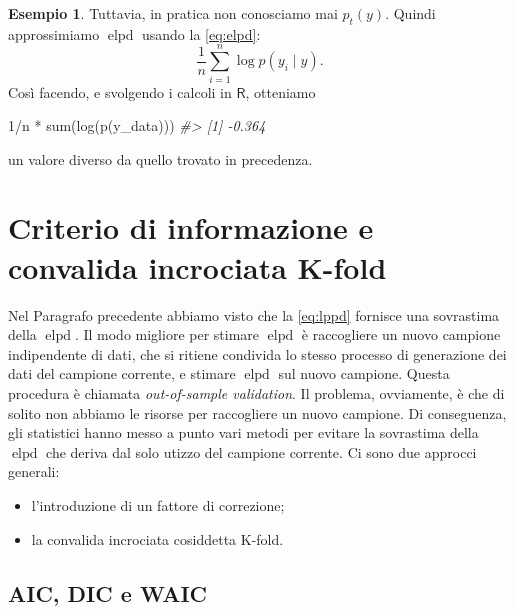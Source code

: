 \documentclass[
  10pt,
  italian,
  a4paper,
  extrafontsizes,onecolumn,openright
  ]{memoir}
\newenvironment{Shaded}{\begin{snugshade}}{\end{snugshade}}
\newcommand{\CommentTok}[1]{\textcolor[rgb]{0.56,0.35,0.01}{\textit{#1}}}
\newcommand{\DecValTok}[1]{\textcolor[rgb]{0.00,0.00,0.81}{#1}}
\newcommand{\FunctionTok}[1]{\textcolor[rgb]{0.00,0.00,0.00}{#1}}
\newcommand{\NormalTok}[1]{#1}
\newcommand{\SpecialCharTok}[1]{\textcolor[rgb]{0.00,0.00,0.00}{#1}}
\providecommand{\tightlist}{%
  \setlength{\itemsep}{0pt}\setlength{\parskip}{0pt}}
\DeclareMathOperator{\elpd}{elpd} %
\newcommand{\R}{\textsf{R}} %
\theoremstyle{definition}
\theoremstyle{definition}
\newtheorem{example}{Esempio}[chapter]
\theoremstyle{definition}
\theoremstyle{definition}
\theoremstyle{remark}
\begin{document}
\begin{example}
\noindent
Tuttavia, in pratica non conosciamo mai \(p_t(y)\). Quindi approssimiamo \(\elpd\) usando la \eqref{eq:elpd}:
\[
\frac{1}{n} \sum_{i=1}^n \log p(y_i \mid y).
\]
\noindent
Così facendo, e svolgendo i calcoli in \(\R\), otteniamo

\begin{Shaded}
\begin{Highlighting}[]
\DecValTok{1}\SpecialCharTok{/}\NormalTok{n }\SpecialCharTok{*} \FunctionTok{sum}\NormalTok{(}\FunctionTok{log}\NormalTok{(}\FunctionTok{p}\NormalTok{(y\_data)))}
\CommentTok{\#\textgreater{} [1] {-}0.364}
\end{Highlighting}
\end{Shaded}

\noindent
un valore diverso da quello trovato in precedenza.
\end{example}

\hypertarget{criterio-di-informazione-e-convalida-incrociata-k-fold}{%
\section{Criterio di informazione e convalida incrociata K-fold}\label{criterio-di-informazione-e-convalida-incrociata-k-fold}}

Nel Paragrafo precedente abbiamo visto che la \eqref{eq:lppd} fornisce una sovrastima della \(\elpd\). Il modo migliore per stimare \(\elpd\) è raccogliere un nuovo campione indipendente di dati, che si ritiene condivida lo stesso processo di generazione dei dati del campione corrente, e stimare \(\elpd\) sul nuovo campione. Questa procedura è chiamata \emph{out-of-sample validation}. Il problema, ovviamente, è che di solito non abbiamo le risorse per raccogliere un nuovo campione. Di conseguenza, gli statistici hanno messo a punto vari metodi per evitare la sovrastima della \(\elpd\) che deriva dal solo utizzo del campione corrente. Ci sono due approcci generali:

\begin{itemize}
\tightlist
\item
  l'introduzione di un fattore di correzione;
\item
  la convalida incrociata cosiddetta K-fold.
\end{itemize}

\hypertarget{aic-dic-e-waic}{%
\subsection{AIC, DIC e WAIC}\label{aic-dic-e-waic}}
\end{document}
